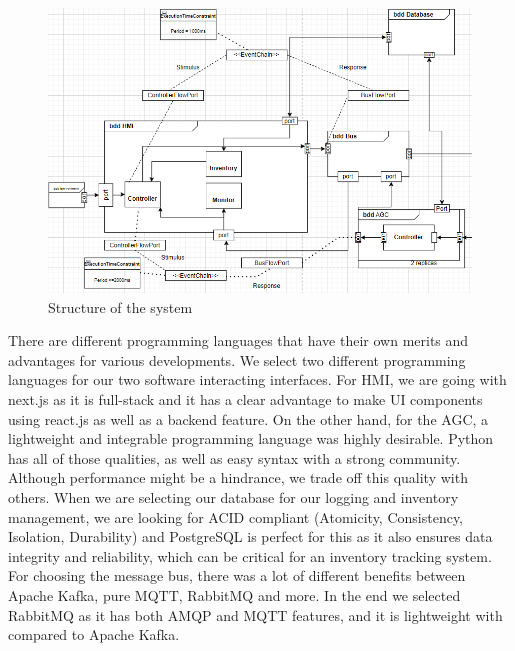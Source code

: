 \begin{figure}[h]
\centering
  \includegraphics[width=\linewidth]{images/structuremodel2.png}
  \caption{Structure of the system}
  \label{fig:boat1}
\end{figure}

There are different programming languages that have their own merits and advantages for various developments. We select two different programming languages for our two software interacting interfaces. For HMI, we are going with next.js as it is full-stack and it has a clear advantage to make UI components using react.js as well as a backend feature. On the other hand, for the AGC, a lightweight and integrable programming language was highly desirable. Python has all of those qualities, as well as easy syntax with a strong community. Although performance might be a hindrance, we trade off this quality with others. When we are selecting our database for our logging and inventory management, we are looking for ACID compliant (Atomicity, Consistency, Isolation, Durability) and PostgreSQL is perfect for this as it also ensures data integrity and reliability, which can be critical for an inventory tracking system. For choosing the message bus, there was a lot of different benefits between Apache Kafka, pure MQTT, RabbitMQ and more. In the end we selected RabbitMQ as it has both AMQP and MQTT features, and it is lightweight with compared to Apache Kafka.

